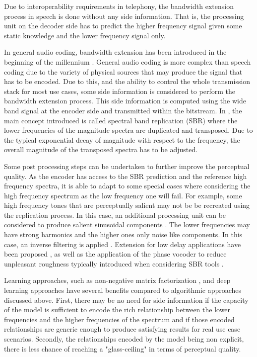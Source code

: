 \documentclass{article}
\begin{document}
Due to interoperability requirements in telephony, the bandwidth extension process in speech is done without any side information. That is, the processing unit on the decoder side has to predict the higher frequency signal given some static knowledge and the lower frequency signal only.

In general audio coding, bandwidth extension has been introduced in the beginning of the millennium \cite{dietz2002spectral}. General audio coding is more complex than speech coding due to the variety of physical sources that may produce the signal that has to be encoded. Due to this, and the ability to control the whole transmission stack for most use cases, some side information is considered to perform the bandwidth extension process. This side information is computed using the wide band signal at the encoder side and transmitted within the bitstream. In \cite{dietz2002spectral}, the main concept introduced is called spectral band replication (SBR) where the lower frequencies of the magnitude spectra are duplicated and transposed. Due to the typical exponential decay of magnitude with respect to the frequency, the overall magnitude of the transposed spectra has to be adjusted.

Some post processing steps can be undertaken to further improve the perceptual quality. As the encoder has access to the SBR prediction and the reference high frequency spectra, it is able to adapt to some special cases where considering the high frequency spectrum as the low frequency one will fail. For example, some high frequency tones that are perceptually salient may not be be recreated using the replication process. In this case, an additional processing unit can be considered to produce salient sinusoidal components \cite{ekstrand2002bandwidth}. The lower frequencies may have strong harmonics and the higher ones only noise like components. In this case, an inverse filtering is applied \cite{ehret2004audio}. Extension for low delay applications have been proposed \cite{friedrich2007spectral}, as well as the application of the phase vocoder \cite{flanagan1966phase} to reduce unpleasant roughness typically introduced when considering SBR tools \cite{nagel2009harmonic}.

Learning approaches, such as non-negative matrix factorization \cite{sun2013non}, and deep learning approaches \cite{miron2018high} have several benefits compared to algorithmic approaches discussed above. First, there may be no need for side information if the capacity of the model is sufficient to encode the rich relationship between the lower frequencies and the higher frequencies of the spectrum and if those encoded relationships are generic enough to produce satisfying results for real use case scenarios. Secondly, the relationships encoded by the model being non explicit, there is less chance of reaching a "glass-ceiling" in terms of perceptual quality.
\end{document}
